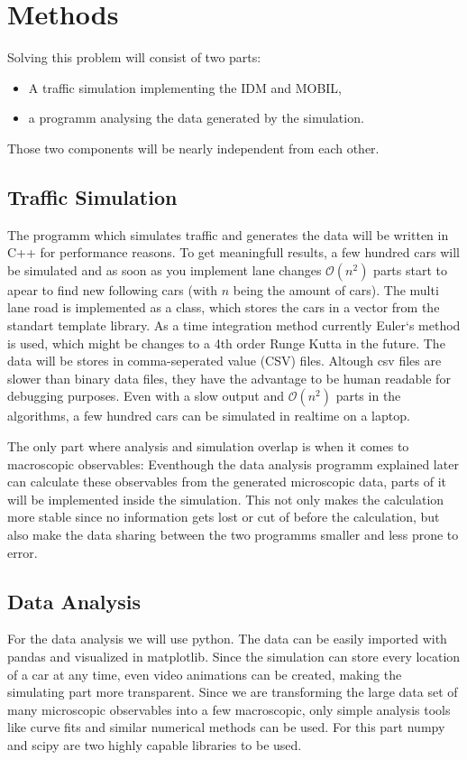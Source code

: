 \section{Methods}
\label{sec:methods}
Solving this problem will consist of two parts: 
\begin{itemize}
  \item A traffic simulation implementing the IDM and MOBIL,
  \item a programm analysing the data generated by the simulation.
\end{itemize}
Those two components will be nearly independent from each other.

\subsection{Traffic Simulation}
\label{sec:traffic_simulation}
The programm which simulates traffic and generates the data will be written in C++ for performance reasons. To get
meaningfull results, a few hundred cars will be simulated and as soon as you implement lane changes $\mathcal{O}(n^2)$
parts start to apear to find new following cars (with $n$ being the amount of cars). The multi lane road is implemented
as a class, which stores the cars in a vector from the standart template library. As a time integration method currently
Euler`s method is used, which might be changes to a 4th order Runge Kutta in the future. The data will be stores in
comma-seperated value (CSV) files. Altough csv files are slower than binary data files, they have the advantage to be
human readable for debugging purposes. Even with a slow output and $\mathcal{O}(n^2)$ parts in the algorithms,
a few hundred cars can be simulated in realtime on a laptop. 

The only part where analysis and simulation overlap is when it comes to macroscopic observables: Eventhough the data 
analysis programm explained later can calculate these observables from the generated microscopic data, parts of it will
be implemented inside the simulation. This not only makes the calculation more stable since no information gets lost or
cut of before the calculation, but also make the data sharing between the two programms smaller and less prone to error.

\subsection{Data Analysis}
\label{sec:data_analysis}
For the data analysis we will use python. The data can be easily imported with pandas and visualized in matplotlib.
Since the simulation can store every location of a car at any time, even video animations can be created, making the
simulating part more transparent. Since we are transforming the large data set of many microscopic observables into a
few macroscopic, only simple analysis tools like curve fits and similar numerical methods can be used. For this part
numpy and scipy are two highly capable libraries to be used.

